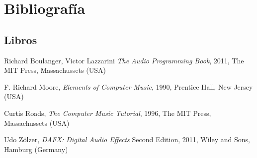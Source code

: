 \section{Bibliografía}
\subsection{Libros}
\begin{thebibliography}{9}
  Richard Boulanger, Victor Lazzarini
  \emph{The Audio Programming Book},
  2011, The MIT Press, Massachussets (USA)
 
  F. Richard Moore,
  \emph{Elements of Computer Music},
  1990, Prentice Hall, New Jersey (USA)
 
  Curtis Roads,
  \emph{The Computer Music Tutorial},
  1996, The MIT Press, Massachussets (USA)
    
  Udo Zölzer,
  \emph{DAFX: Digital Audio Effects}
  Second Edition, 2011, Wiley and Sons, Hamburg (Germany)
\end{thebibliography}
  
